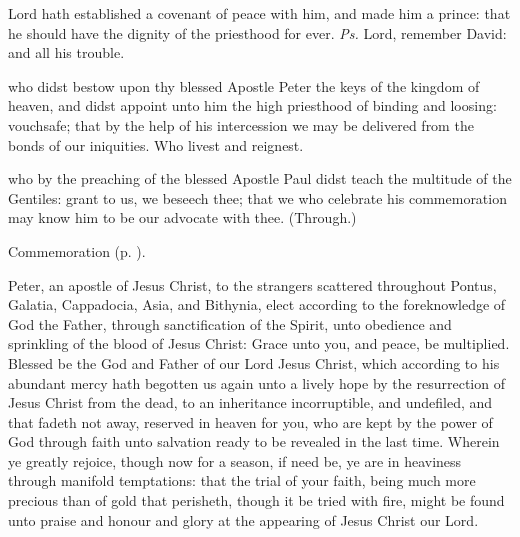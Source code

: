 
\vspace{-0.5\baselineskip}

\introit

\vspace{-0.25\baselineskip}

 Lord hath established a covenant of peace with him, and made him a prince: that he should have the dignity of the priesthood for ever. \textit{Ps.} Lord, remember David: and all his trouble.

\vspace{-0.4\baselineskip}

\collect

\vspace{-0.2\baselineskip}

 who didst bestow upon thy blessed Apostle Peter the keys of the kingdom of heaven, and didst appoint unto him the high priesthood of binding and loosing: vouchsafe; that by the help of his intercession we may be delivered from the bonds of our iniquities. Who livest and reignest.

 who by the preaching of the blessed Apostle Paul didst teach the multitude of the Gentiles: grant to us, we beseech thee; that we who celebrate his commemoration may know him to be our advocate with thee. (Through.)

\begin{rubric}
    Commemoration  (p. \pageref{PriscaCollect}).
\end{rubric}

 Peter, an apostle of Jesus Christ, to the strangers scattered throughout Pontus, Galatia, Cappadocia, Asia, and Bithynia, elect according to the foreknowledge of God the Father, through sanctification of the Spirit, unto obedience and sprinkling of the blood of Jesus Christ: Grace unto you, and peace, be multiplied. Blessed be the God and Father of our Lord Jesus Christ, which according to his abundant mercy hath begotten us again unto a lively hope by the resurrection of Jesus Christ from the dead, to an inheritance incorruptible, and undefiled, and that fadeth not away, reserved in heaven for you, who are kept by the power of God through faith unto salvation ready to be revealed in the last time. Wherein ye greatly rejoice, though now for a season, if need be, ye are in heaviness through manifold temptations: that the trial of your faith, being much more precious than of gold that perisheth, though it be tried with fire, might be found unto praise and honour and glory at the appearing of Jesus Christ our Lord.

